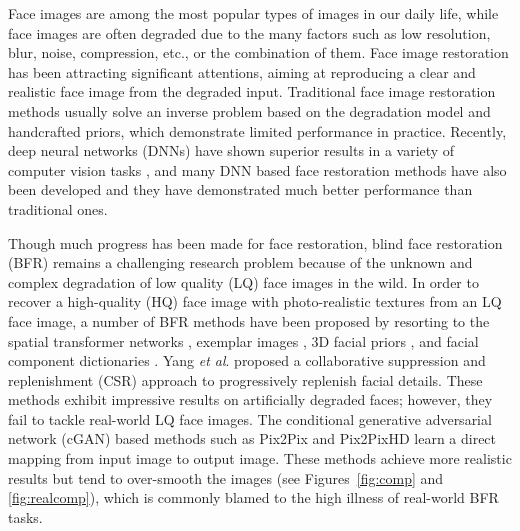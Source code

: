\documentclass[final]{cvpr}
\begin{document}
Face images are among the most popular types of images in our daily life, while face images are often degraded due to the many factors such as low resolution, blur, noise, compression, etc., or the combination of them. Face image restoration has been attracting significant attentions, aiming at reproducing a clear and realistic face image from the degraded input. Traditional face image restoration methods \cite{Zhang2011Sparseprior,Bourlai2011Restore,Bakerand2000Hallucinate,Nishiyama2009Face} usually solve an inverse problem based on the degradation model and handcrafted priors, which demonstrate limited performance in practice. Recently, deep neural networks (DNNs) have shown superior results in a variety of computer vision tasks \cite{Kupyn2017DeblurGAN,Yu2018Deepfill,Guo2019CBDNet,Ledig2017SRGAN,Lim2017EDSR}, and many DNN based face restoration methods \cite{Yu2017Hallucinating,Li2018GFRNet,Hu20203dprior} have also been developed and they have demonstrated much better performance than traditional ones. 

Though much progress has been made for face restoration, blind face restoration (BFR) remains a challenging research problem because of the unknown and complex degradation of low quality (LQ) face images in the wild. In order to recover a high-quality (HQ) face image with photo-realistic textures from an LQ face image, a number of BFR methods have been proposed by resorting to the spatial transformer networks \cite{Yu2017Hallucinating}, exemplar images \cite{Li2018GFRNet,Li2020ASFFNet,Dogan2019Exemplar}, 3D facial priors \cite{Hu20203dprior}, and facial component dictionaries \cite{Li2020Restore}. Yang \emph{et al}. \cite{Yang2020HiFaceGANFR} proposed a collaborative suppression and replenishment (CSR) approach to progressively replenish facial details. These methods exhibit impressive results on artificially degraded faces; however, they fail to tackle real-world LQ face images. The conditional generative adversarial network (cGAN) based methods such as Pix2Pix \cite{Isola2017Pix2Pix} and Pix2PixHD \cite{Wang2018Pix2PixHD} learn a direct mapping from input image to output image. These methods achieve more realistic results but tend to over-smooth the images (see Figures~\ref{fig:comp} and \ref{fig:realcomp}), which is commonly blamed to the high illness of real-world BFR tasks. 
\end{document}
